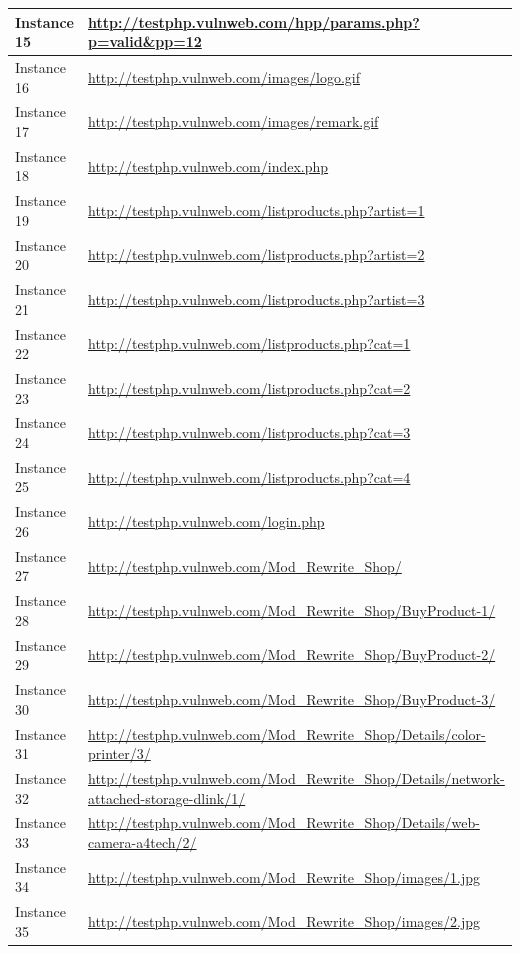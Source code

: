 \documentclass[12pt]{article}
\begin{document}
\begin{center}
\begin{longtable}{|l|p{10cm}|}
\hline
Instance 15 & \url{http://testphp.vulnweb.com/hpp/params.php?p=valid\&pp=12} \\
\hline
Instance 16 & \url{http://testphp.vulnweb.com/images/logo.gif} \\
\hline
Instance 17 & \url{http://testphp.vulnweb.com/images/remark.gif} \\
\hline
Instance 18 & \url{http://testphp.vulnweb.com/index.php} \\
\hline
Instance 19 & \url{http://testphp.vulnweb.com/listproducts.php?artist=1} \\
\hline
Instance 20 & \url{http://testphp.vulnweb.com/listproducts.php?artist=2} \\
\hline
Instance 21 & \url{http://testphp.vulnweb.com/listproducts.php?artist=3} \\
\hline
Instance 22 & \url{http://testphp.vulnweb.com/listproducts.php?cat=1} \\
\hline
Instance 23 & \url{http://testphp.vulnweb.com/listproducts.php?cat=2} \\
\hline
Instance 24 & \url{http://testphp.vulnweb.com/listproducts.php?cat=3} \\
\hline
Instance 25 & \url{http://testphp.vulnweb.com/listproducts.php?cat=4} \\
\hline
Instance 26 & \url{http://testphp.vulnweb.com/login.php} \\
\hline
Instance 27 & \url{http://testphp.vulnweb.com/Mod\_Rewrite\_Shop/} \\
\hline
Instance 28 & \url{http://testphp.vulnweb.com/Mod\_Rewrite\_Shop/BuyProduct-1/} \\
\hline
Instance 29 & \url{http://testphp.vulnweb.com/Mod\_Rewrite\_Shop/BuyProduct-2/} \\
\hline
Instance 30 & \url{http://testphp.vulnweb.com/Mod\_Rewrite\_Shop/BuyProduct-3/} \\
\hline
Instance 31 & \url{http://testphp.vulnweb.com/Mod\_Rewrite\_Shop/Details/color-printer/3/} \\
\hline
Instance 32 & \url{http://testphp.vulnweb.com/Mod\_Rewrite\_Shop/Details/network-attached-storage-dlink/1/} \\
\hline
Instance 33 & \url{http://testphp.vulnweb.com/Mod\_Rewrite\_Shop/Details/web-camera-a4tech/2/} \\
\hline
Instance 34 & \url{http://testphp.vulnweb.com/Mod\_Rewrite\_Shop/images/1.jpg} \\
\hline
Instance 35 & \url{http://testphp.vulnweb.com/Mod\_Rewrite\_Shop/images/2.jpg} \\

\end{longtable}
\end{center}
\end{document}
